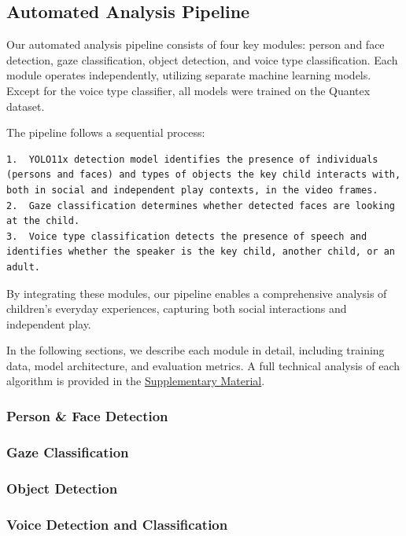 \documentclass[
  man,floatsintext]{apa6}
\begin{document}
\subsection{Automated Analysis Pipeline}\label{automatic-analysis}

Our automated analysis pipeline consists of four key modules: person and face detection, gaze classification, object detection, and voice type classification. Each module operates independently, utilizing separate machine learning models. Except for the voice type classifier, all models were trained on the Quantex dataset.

The pipeline follows a sequential process:

\begin{verbatim}
1.  YOLO11x detection model identifies the presence of individuals (persons and faces) and types of objects the key child interacts with, both in social and independent play contexts, in the video frames.
2.  Gaze classification determines whether detected faces are looking at the child.
3.  Voice type classification detects the presence of speech and identifies whether the speaker is the key child, another child, or an adult.
\end{verbatim}

By integrating these modules, our pipeline enables a comprehensive analysis of children's everyday experiences, capturing both social interactions and independent play.

In the following sections, we describe each module in detail, including training data, model architecture, and evaluation metrics. A full technical analysis of each algorithm is provided in the \hyperref[supplementary-material]{Supplementary Material}.

\subsubsection{Person \& Face Detection}\label{person-face-detection}

\subsubsection{Gaze Classification}\label{gaze-classification}

\subsubsection{Object Detection}\label{object-detection}

\subsubsection{Voice Detection and Classification}\label{voice-detection-and-classification}
\end{document}
